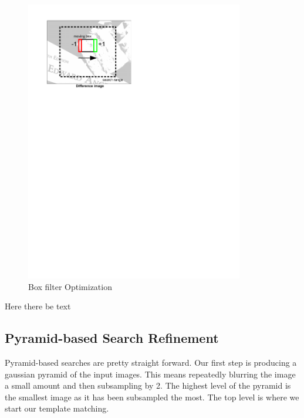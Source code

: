 \begin{figure}[h]
\begin{center}
  \includegraphics[trim = 0in 8in 3.5in 0in, width=3.75in]{images/stereo/boxfilter.pdf}
\end{center}
  \caption{Box filter Optimization}
  \label{fig:box_filter}
\end{figure}

Here there be text

\subsection{Pyramid-based Search Refinement}

Pyramid-based searches are pretty straight forward. Our first step is
producing a gaussian pyramid of the input images. This means
repeatedly blurring the image a small amount and then subsampling by
2. The highest level of the pyramid is the smallest image as it has
been subsampled the most. The top level is where we start our template
matching.

